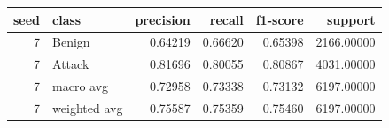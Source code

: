 \begin{tabular}{rlrrrr}
\toprule
seed & class & precision & recall & f1-score & support \\
\midrule
7 & Benign & 0.64219 & 0.66620 & 0.65398 & 2166.00000 \\
7 & Attack & 0.81696 & 0.80055 & 0.80867 & 4031.00000 \\
7 & macro avg & 0.72958 & 0.73338 & 0.73132 & 6197.00000 \\
7 & weighted avg & 0.75587 & 0.75359 & 0.75460 & 6197.00000 \\
\bottomrule
\end{tabular}
